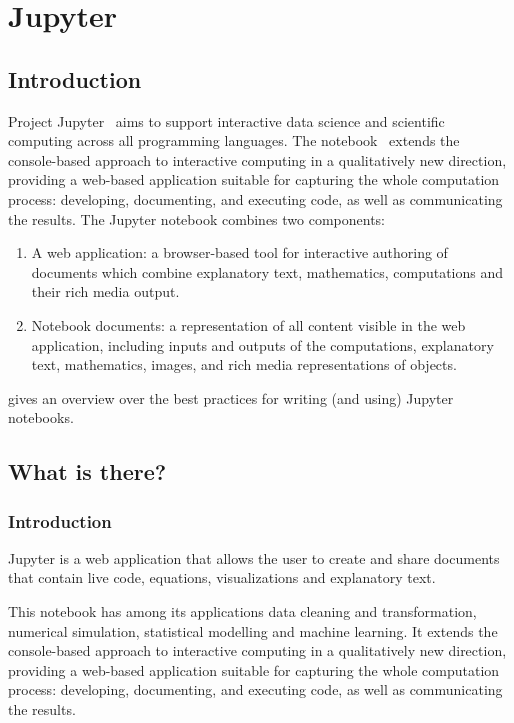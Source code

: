 \section{Jupyter}\label{sec:jupyter}

\subsection{Introduction}

Project Jupyter~\cite{jupyter-project:on,jupyter-doc:on,jupyter-git:on} aims to support
interactive data science and scientific computing across all programming languages. The
notebook~\cite{jupyter-notebook:on} extends the console-based approach to interactive
computing in a qualitatively new direction, providing a web-based application suitable for
capturing the whole computation process: developing, documenting, and executing code, as
well as communicating the results. The Jupyter notebook combines two components:
\begin{enumerate}
\item A web application: a browser-based tool for interactive authoring of documents which
  combine explanatory text, mathematics, computations and their rich media output.
\item Notebook documents: a representation of all content visible in the web application,
  including inputs and outputs of the computations, explanatory text, mathematics, images,
  and rich media representations of objects.
\end{enumerate}
\cite{juplit:on} gives an overview over the best practices for writing (and using)
Jupyter notebooks.

\subsection{What is there?}\label{sec:intro}

\subsubsection{Introduction}
Jupyter is a web application that allows the user to create and share documents that
contain live code, equations, visualizations and explanatory text.

This notebook has among its applications data cleaning and transformation, numerical
simulation, statistical modelling and machine learning. It extends the console-based
approach to interactive computing in a qualitatively new direction, providing a web-based
application suitable for capturing the whole computation process: developing, documenting,
and executing code, as well as communicating the results.

